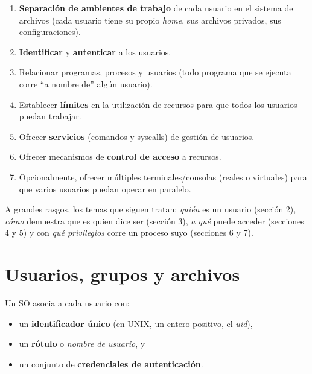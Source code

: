 \documentclass[11pt,a4paper]{article}
\begin{document}
\begin{enumerate}[leftmargin=*]
    \item \textbf{Separación de ambientes de trabajo} de cada usuario
        en el sistema de archivos (cada usuario tiene su propio
        \emph{home}, sus archivos privados, sus configuraciones).
    \item \textbf{Identificar} y \textbf{autenticar} a los usuarios.
    \item Relacionar programas, procesos y usuarios (todo programa que
        se ejecuta corre ``a nombre de'' algún usuario).
    \item Establecer \textbf{límites} en la utilización de recursos
        para que todos los usuarios puedan trabajar.
    \item Ofrecer \textbf{servicios} (comandos y syscalls) de gestión
        de usuarios.
    \item Ofrecer mecanismos de \textbf{control de acceso} a recursos.
    \item Opcionalmente, ofrecer múltiples terminales/consolas (reales
        o virtuales) para que varios usuarios puedan operar en
        paralelo.
\end{enumerate}

\begin{idea}
A grandes rasgos, los temas que siguen tratan: \emph{quién} es un
usuario (sección 2), \emph{cómo} demuestra que es quien dice ser
(sección 3), \emph{a qué} puede acceder (secciones 4 y 5) y con
\emph{qué privilegios} corre un proceso suyo (secciones 6 y 7).
\end{idea}

\section{Usuarios, grupos y archivos}

Un SO asocia a cada usuario con:

\begin{itemize}[leftmargin=*,nosep]
    \item un \textbf{identificador único} (en UNIX, un entero positivo,
        el \emph{uid}),
    \item un \textbf{rótulo} o \emph{nombre de usuario}, y
    \item un conjunto de \textbf{credenciales de autenticación}.
\end{itemize}
\end{document}
